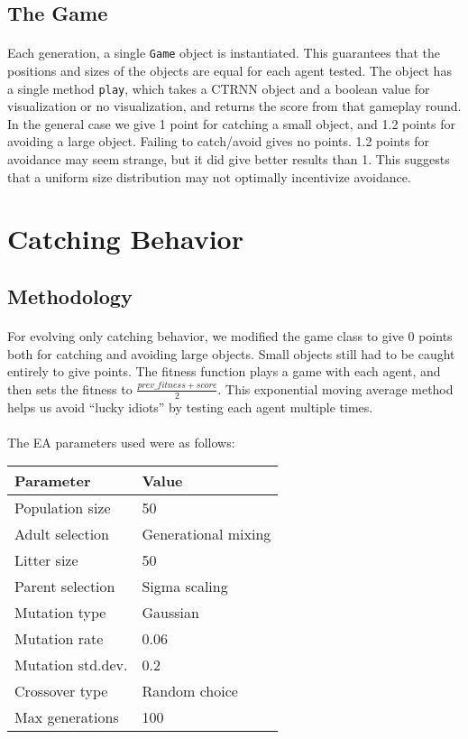 \documentclass[a4paper,12pt]{article}
\begin{document}
\subsection{The Game}
\paragraph{}Each generation, a single \texttt{Game} object is instantiated. This guarantees that the positions and sizes of the objects are equal for each agent tested. The object has a single method \texttt{play}, which takes a CTRNN object and a boolean value for visualization or no visualization, and returns the score from that gameplay round. In the general case we give 1 point for catching a small object, and 1.2 points for avoiding a large object. Failing to catch/avoid gives no points. 1.2 points for avoidance may seem strange, but it did give better results than 1. This suggests that a uniform size distribution may not optimally incentivize avoidance.

\section{Catching Behavior}
\subsection{Methodology}
\paragraph{}For evolving only catching behavior, we modified the game class to give 0 points both for catching and avoiding large objects. Small objects still had to be caught entirely to give points. The fitness function plays a game with each agent, and then sets the fitness to $\frac{prev\_fitness + score}{2}$. This exponential moving average method helps us avoid ``lucky idiots'' by testing each agent multiple times.
\paragraph{}The EA parameters used were as follows:\\
\begin{tabular}{ll}
\hline
Parameter & Value \\
\hline \hline
Population size & 50 \\
Adult selection & Generational mixing \\
Litter size & 50 \\
Parent selection & Sigma scaling \\
Mutation type & Gaussian \\
Mutation rate & 0.06 \\
Mutation std.dev. & 0.2 \\
Crossover type & Random choice \\
Max generations & 100 \\
\hline
\end{tabular}
\end{document}

